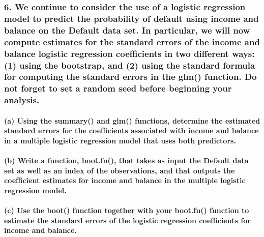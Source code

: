 \documentclass[
]{article}
\begin{document}
\subsubsection{6. We continue to consider the use of a logistic
regression model to predict the probability of default using income and
balance on the Default data set. In particular, we will now compute
estimates for the standard errors of the income and balance logistic
regression coefficients in two different ways: (1) using the bootstrap,
and (2) using the standard formula for computing the standard errors in
the glm() function. Do not forget to set a random seed before beginning
your
analysis.}\label{we-continue-to-consider-the-use-of-a-logistic-regression-model-to-predict-the-probability-of-default-using-income-and-balance-on-the-default-data-set.-in-particular-we-will-now-compute-estimates-for-the-standard-errors-of-the-income-and-balance-logistic-regression-coefficients-in-two-different-ways-1-using-the-bootstrap-and-2-using-the-standard-formula-for-computing-the-standard-errors-in-the-glm-function.-do-not-forget-to-set-a-random-seed-before-beginning-your-analysis.}

\paragraph{(a) Using the summary() and glm() functions, determine the
estimated standard errors for the coefficients associated with income
and balance in a multiple logistic regression model that uses both
predictors.}\label{a-using-the-summary-and-glm-functions-determine-the-estimated-standard-errors-for-the-coefficients-associated-with-income-and-balance-in-a-multiple-logistic-regression-model-that-uses-both-predictors.}

\paragraph{(b) Write a function, boot.fn(), that takes as input the
Default data set as well as an index of the observations, and that
outputs the coefficient estimates for income and balance in the multiple
logistic regression
model.}\label{b-write-a-function-boot.fn-that-takes-as-input-the-default-data-set-as-well-as-an-index-of-the-observations-and-that-outputs-the-coefficient-estimates-for-income-and-balance-in-the-multiple-logistic-regression-model.}

\paragraph{(c) Use the boot() function together with your boot.fn()
function to estimate the standard errors of the logistic regression
coefficients for income and
balance.}\label{c-use-the-boot-function-together-with-your-boot.fn-function-to-estimate-the-standard-errors-of-the-logistic-regression-coefficients-for-income-and-balance.}
\end{document}
